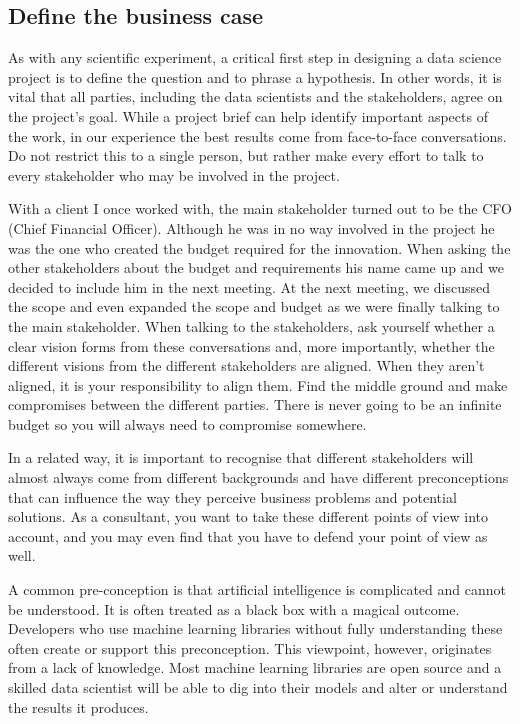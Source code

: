 \documentclass[
]{book}
\begin{document}
\hypertarget{define-the-business-case}{%
\subsection{Define the business case}\label{define-the-business-case}}

As with any scientific experiment, a critical first step in designing a data science project is to define the question and to phrase a hypothesis. In other words, it is vital that all parties, including the data scientists and the stakeholders, agree on the project's goal. While a project brief can help identify important aspects of the work, in our experience the best results come from face-to-face conversations. Do not restrict this to a single person, but rather make every effort to talk to every stakeholder who may be involved in the project.

With a client I once worked with, the main stakeholder turned out to be the CFO (Chief Financial Officer). Although he was in no way involved in the project he was the one who created the budget required for the innovation. When asking the other stakeholders about the budget and requirements his name came up and we decided to include him in the next meeting. At the next meeting, we discussed the scope and even expanded the scope and budget as we were finally talking to the main stakeholder. When talking to the stakeholders, ask yourself whether a clear vision forms from these conversations and, more importantly, whether the different visions from the different stakeholders are aligned. When they aren't aligned, it is your responsibility to align them. Find the middle ground and make compromises between the different parties. There is never going to be an infinite budget so you will always need to compromise somewhere.

In a related way, it is important to recognise that different stakeholders will almost always come from different backgrounds and have different preconceptions that can influence the way they perceive business problems and potential solutions. As a consultant, you want to take these different points of view into account, and you may even find that you have to defend your point of view as well.

A common pre-conception is that artificial intelligence is complicated and cannot be understood. It is often treated as a black box with a magical outcome. Developers who use machine learning libraries without fully understanding these often create or support this preconception. This viewpoint, however, originates from a lack of knowledge. Most machine learning libraries are open source and a skilled data scientist will be able to dig into their models and alter or understand the results it produces.
\end{document}
